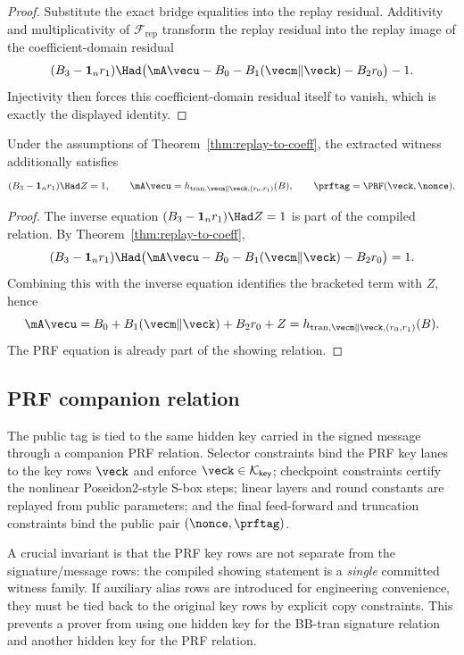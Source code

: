 \begin{proof}
Substitute the exact bridge equalities into the replay residual.  Additivity and multiplicativity of
$\mathcal F_{\mathrm{rep}}$ transform the replay residual into the replay image of the coefficient-domain residual
\[
  (B_3-\mathbf 1_n r_1)\Had\bigl(\mA\vecu-B_0-B_1(\vecm\Vert\veck)-B_2r_0\bigr)-1.
\]
Injectivity then forces this coefficient-domain residual itself to vanish, which is exactly the displayed
identity.
\end{proof}

\begin{corollary}\label{cor:showing-to-abstract}
Under the assumptions of Theorem~\ref{thm:replay-to-coeff}, the extracted witness additionally satisfies
\[
  (B_3-\mathbf 1_n r_1)\Had Z=1,
  \qquad
  \mA\vecu=h_{\mathrm{tran},\vecm\Vert\veck,(r_0,r_1)}(B),
  \qquad
  \prftag=\PRF(\veck,\nonce).
\]
\end{corollary}

\begin{proof}
The inverse equation $(B_3-\mathbf 1_n r_1)\Had Z=1$ is part of the compiled relation.  By
Theorem~\ref{thm:replay-to-coeff},
\[
  (B_3-\mathbf 1_n r_1)\Had\bigl(\mA\vecu-B_0-B_1(\vecm\Vert\veck)-B_2r_0\bigr)=1.
\]
Combining this with the inverse equation identifies the bracketed term with $Z$, hence
\[
  \mA\vecu=B_0+B_1(\vecm\Vert\veck)+B_2r_0+Z
  =h_{\mathrm{tran},\vecm\Vert\veck,(r_0,r_1)}(B).
\]
The PRF equation is already part of the showing relation.
\end{proof}

\subsection{PRF companion relation}
\label{subsec:prf-checkpointed}
The public tag is tied to the same hidden key carried in the signed message through a companion PRF
relation.  Selector constraints bind the PRF key lanes to the key rows $\veck$ and enforce
$\veck\in\mathcal K_{\mathsf{key}}$; checkpoint constraints certify the nonlinear Poseidon2-style S-box steps;
linear layers and round constants are replayed from public parameters; and the final feed-forward and truncation
constraints bind the public pair $(\nonce,\prftag)$.

A crucial invariant is that the PRF key rows are not separate from the signature/message rows: the compiled
showing statement is a \emph{single} committed witness family.  If auxiliary alias rows are introduced for
engineering convenience, they must be tied back to the original key rows by explicit copy constraints.  This
prevents a prover from using one hidden key for the BB-tran signature relation and another hidden key for the
PRF relation.

